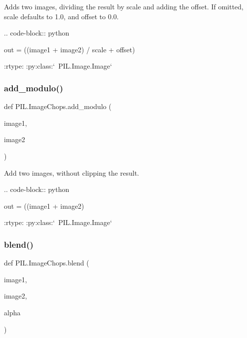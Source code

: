 \begin{DoxyVerb}Adds two images, dividing the result by scale and adding the
offset. If omitted, scale defaults to 1.0, and offset to 0.0.

.. code-block:: python

    out = ((image1 + image2) / scale + offset)

:rtype: :py:class:`~PIL.Image.Image`
\end{DoxyVerb}
 \mbox{\label{namespacePIL_1_1ImageChops_aeaa07196844a79bde521e1e69c5838ea}} 
\subsubsection{\texorpdfstring{add\+\_\+modulo()}{add\_modulo()}}
{\footnotesize\ttfamily def P\+I\+L.\+Image\+Chops.\+add\+\_\+modulo (\begin{DoxyParamCaption}\item[{}]{image1,  }\item[{}]{image2 }\end{DoxyParamCaption})}

\begin{DoxyVerb}Add two images, without clipping the result.

.. code-block:: python

    out = ((image1 + image2) %

:rtype: :py:class:`~PIL.Image.Image`
\end{DoxyVerb}
 \mbox{\label{namespacePIL_1_1ImageChops_aa43b4e6bb3096e8242768542e0c30c16}} 
\subsubsection{\texorpdfstring{blend()}{blend()}}
{\footnotesize\ttfamily def P\+I\+L.\+Image\+Chops.\+blend (\begin{DoxyParamCaption}\item[{}]{image1,  }\item[{}]{image2,  }\item[{}]{alpha }\end{DoxyParamCaption})}

